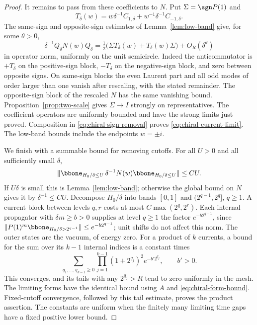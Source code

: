 \begin{proof}
It remains to pass from these coefficients to $N$. Put
$\Sigma=\sgn P(1)$ and
\[
 T_\delta(w)=w\delta^{-1}C_{1,\delta}
                         +w^{-1}\delta^{-1}C_{-1,\delta}.
\]
The same-sign and opposite-sign estimates of Lemma~\ref{lem:low-band}
give, for some $\theta>0$,
\begin{equation}\label{eq:chiral-sign-removal}
 \delta^{-1}Q_\delta N(w)Q_\delta
       =\tfrac12\bigl(\Sigma T_\delta(w)+T_\delta(w)\Sigma\bigr)
                       +O_R(\delta^\theta)
\end{equation}
in operator norm, uniformly on the unit semicircle. Indeed the
anticommutator is $+T_\delta$ on the positive-sign block,
$-T_\delta$ on the negative-sign block, and zero between opposite signs.
On same-sign blocks the even Laurent part and all odd modes of order
larger than one vanish after rescaling, with the stated remainder.
The opposite-sign block of the rescaled $N$ has the same vanishing bound.
Proposition~\ref{prop:two-scale} gives $\Sigma\to I$ strongly on
representatives. The coefficient operators are uniformly bounded and have
the strong limits just proved. Composition in
\eqref{eq:chiral-sign-removal} proves \eqref{eq:chiral-current-limit}.
The low-band bounds include the endpoints $w=\pm i$.

We finish with a summable bound for removing cutoffs. For all $U>0$ and
all sufficiently small $\delta$,
\begin{equation}\label{eq:chiral-all-band-bound}
 \|\bbone_{H_0/\delta\le U}\,\delta^{-1}N(w)
                      \bbone_{H_0/\delta\le U}\|\le CU.
\end{equation}
If $U\delta$ is small this is Lemma~\ref{lem:low-band}; otherwise the
global bound on $N$ gives it by $\delta^{-1}\le C U$.
Decompose $H_0/\delta$ into bands $[0,1]$ and
$(2^{q-1},2^q]$, $q\ge1$. A current block between levels $q,r$ costs
at most $C\max(2^q,2^r)$. Each internal propagator with
$\delta m\ge b>0$ supplies at level $q\ge1$ the factor
$e^{-b2^{q-1}}$, since
$\|P(1)^m\bbone_{H_0/\delta>2^{q-1}}\|\le e^{-b2^{q-1}}$;
unit shifts do not affect this norm.
The outer states are the vacuum, of energy zero. For a product of $k$
currents, a bound for the sum over its $k-1$ internal indices is a constant
times
\begin{equation}\label{eq:chiral-dyadic-majorant}
 \sum_{q_1,\ldots,q_{k-1}\ge0}
       \prod_{j=1}^{k-1}(1+2^{q_j})^2e^{-b'2^{q_j}},
                         \qquad b'>0.
\end{equation}
This converges, and its tails with any $2^{q_j}>R$ tend to zero uniformly
in the mesh. The limiting forms have the identical bound using $A$ and
\eqref{eq:chiral-form-bound}. Fixed-cutoff convergence, followed by this
tail estimate, proves the product assertion. The constants are uniform
when the finitely many limiting time gaps have a fixed positive lower
bound.
\end{proof}

